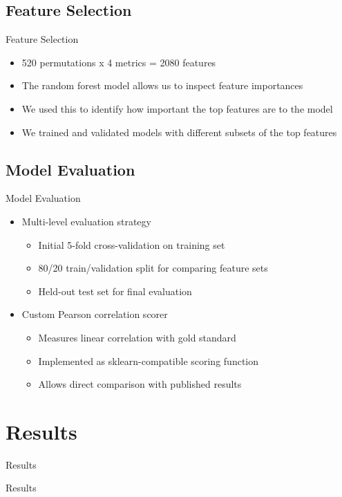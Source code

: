 \documentclass{beamer}
\begin{document}
\subsection{Feature Selection}
\begin{frame}{Feature Selection}
    \begin{itemize}
        \item 520 permutations x 4 metrics = 2080 features
        \item The random forest model allows us to inspect feature importances
        \item We used this to identify how important the top features are to the model
        \item We trained and validated models with different subsets of the top features
    \end{itemize}
\end{frame}

\subsection{Model Evaluation}
\begin{frame}{Model Evaluation}
    \begin{itemize}
        \item Multi-level evaluation strategy
        \begin{itemize}
            \item Initial 5-fold cross-validation on training set
            \item 80/20 train/validation split for comparing feature sets
            \item Held-out test set for final evaluation
        \end{itemize}
        \item Custom Pearson correlation scorer
        \begin{itemize}
            \item Measures linear correlation with gold standard
            \item Implemented as sklearn-compatible scoring function
            \item Allows direct comparison with published results
        \end{itemize}
    \end{itemize}
\end{frame}

\section{Results}
\begin{frame}{Results}
    \begin{center}
        \Large Results
    \end{center}
\end{frame}
\end{document}
